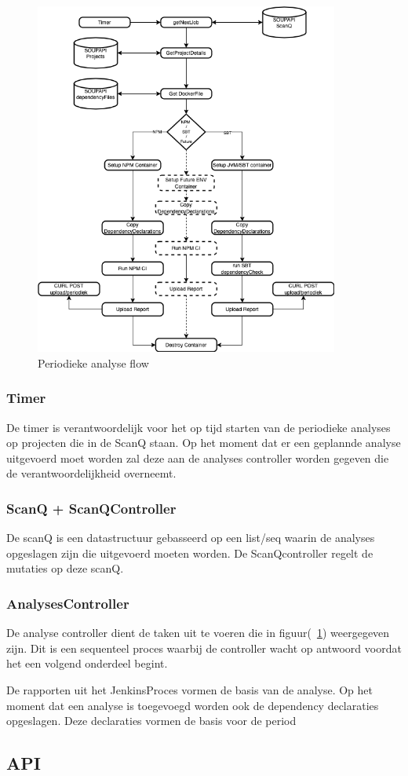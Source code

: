 \begin{figure}[H]
    \myfloatalign
    \includegraphics[width=10cm]{gfx/SOUPAPI-Periodic Analysis}
    \caption{Periodieke analyse flow}
    \label{fig:PeriodicAnalysis}
\end{figure}

\subsubsection{Timer}
De timer is verantwoordelijk voor het op tijd starten van de periodieke analyses op projecten die in de ScanQ staan. Op het moment dat er een geplannde analyse uitgevoerd moet worden zal deze aan de analyses controller worden gegeven die de verantwoordelijkheid overneemt.
\subsubsection{ScanQ + ScanQController}
De scanQ is een datastructuur gebasseerd op een list/seq waarin de analyses opgeslagen zijn die uitgevoerd moeten worden. De ScanQcontroller regelt de mutaties op deze scanQ.
\subsubsection{AnalysesController}
De analyse controller dient de taken uit te voeren die in figuur(~\ref{fig:PeriodicAnalysis}) weergegeven zijn. Dit is een sequenteel proces waarbij de controller wacht op antwoord voordat het een volgend onderdeel begint.



De rapporten uit het JenkinsProces vormen de basis van de analyse. Op het moment dat een analyse is toegevoegd worden ook de dependency declaraties opgeslagen. Deze declaraties vormen de basis voor de period

\subsection{API}\label{subsec:api}







